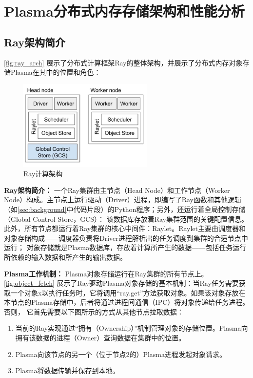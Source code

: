 \chapter{Plasma分布式内存存储架构和性能分析}

\section{Ray架构简介}

\autoref{fig:ray_arch}\cite{ray_whitepaper}
展示了分布式计算框架Ray的整体架构，并展示了分布式内存对象存储Plasma在其中的位置和角色：

\begin{figure}[h] 
    \centering
    \includegraphics[width=0.6\textwidth]{image/chap02/ray_arch.png}
    \caption{Ray计算架构}
    \label{fig:ray_arch}
\end{figure}

\textbf{Ray架构简介：}
一个Ray集群由主节点（Head Node）和工作节点（Worker Node）构成。主节点上运行驱动（Driver）进程，即编写了Ray函数和其他逻辑（如\autoref{sec:background}中代码片段）的Python程序；另外，还运行着全局控制存储（Global Control Store，GCS）：
该数据库存放着Ray集群范围的关键配置信息。此外，所有节点都运行着Ray集群的核心中间件：Raylet。Raylet主要由调度器和对象存储构成——调度器负责将Driver进程解析出的任务调度到集群的合适节点中运行；
对象存储就是Plasma数据库，存放着计算所产生的数据——包括任务运行所依赖的输入数据和所产生的输出数据。

\textbf{Plasma工作机制：}
Plasma对象存储运行在Ray集群的所有节点上。\autoref{fig:object_fetch}\cite{ray_whitepaper}
展示了Ray驱动Plasma对象存储的基本机制：当Ray任务需要获取一个对象x以执行任务时，它将调用“ray.get”方法获取对象。如果该对象存放在本节点的Plasma存储中，后者将通过进程间通信（IPC）将对象传递给任务进程。否则，
它首先需要以下图所示的方式从其他节点拉取数据：

\begin{enumerate}
    \item 当前的Ray实现通过“拥有（Ownership\cite{wang2021ownership}）”机制管理对象的存储位置。Plasma向拥有该数据的进程（Owner）查询数据在集群中的位置。
    \item Plasma向该节点的另一个（位于节点2的）Plasma进程发起对象请求。
    \item Plasma将数据传输并保存到本地。
\end{enumerate}

